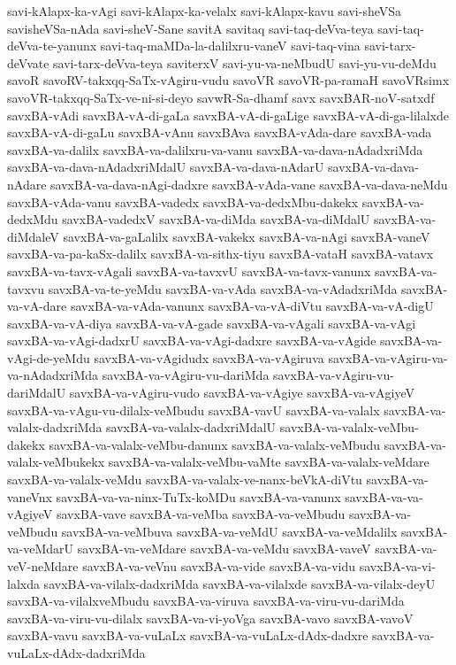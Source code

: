 {savi-kAlapx-ka-vAgi
savi-kAlapx-ka-velalx
savi-kAlapx-kavu
savi-sheVSa
savisheVSa-nAda
savi-sheV-Sane
savitA
savitaq
savi-taq-deVva-teya
savi-taq-deVva-te-yanunx
savi-taq-maMDa-la-dalilxru-vaneV
savi-taq-vina
savi-tarx-deVvate
savi-tarx-deVva-teya
saviterxV
savi-yu-va-neMbudU
savi-yu-vu-deMdu
savoR
savoRV-takxqq-SaTx-vAgiru-vudu
savoVR
savoVR-pa-ramaH
savoVRsimx
savoVR-takxqq-SaTx-ve-ni-si-deyo
savwR-Sa-dhamf
savx
savxBAR-noV-satxdf
savxBA-vAdi
savxBA-vA-di-gaLa
savxBA-vA-di-gaLige
savxBA-vA-di-ga-lilalxde
savxBA-vA-di-gaLu
savxBA-vAnu
savxBAva
savxBA-vAda-dare
savxBA-vada
savxBA-va-dalilx
savxBA-va-dalilxru-va-vanu
savxBA-va-dava-nAdadxriMda
savxBA-va-dava-nAdadxriMdalU
savxBA-va-dava-nAdarU
savxBA-va-dava-nAdare
savxBA-va-dava-nAgi-dadxre
savxBA-vAda-vane
savxBA-va-dava-neMdu
savxBA-vAda-vanu
savxBA-vadedx
savxBA-va-dedxMbu-dakekx
savxBA-va-dedxMdu
savxBA-vadedxV
savxBA-va-diMda
savxBA-va-diMdalU
savxBA-va-diMdaleV
savxBA-va-gaLalilx
savxBA-vakekx
savxBA-va-nAgi
savxBA-vaneV
savxBA-va-pa-kaSx-dalilx
savxBA-va-sithx-tiyu
savxBA-vataH
savxBA-vatavx
savxBA-va-tavx-vAgali
savxBA-va-tavxvU
savxBA-va-tavx-vanunx
savxBA-va-tavxvu
savxBA-va-te-yeMdu
savxBA-va-vAda
savxBA-va-vAdadxriMda
savxBA-va-vA-dare
savxBA-va-vAda-vanunx
savxBA-va-vA-diVtu
savxBA-va-vA-digU
savxBA-va-vA-diya
savxBA-va-vA-gade
savxBA-va-vAgali
savxBA-va-vAgi
savxBA-va-vAgi-dadxrU
savxBA-va-vAgi-dadxre
savxBA-va-vAgide
savxBA-va-vAgi-de-yeMdu
savxBA-va-vAgidudx
savxBA-va-vAgiruva
savxBA-va-vAgiru-va-va-nAdadxriMda
savxBA-va-vAgiru-vu-dariMda
savxBA-va-vAgiru-vu-dariMdalU
savxBA-va-vAgiru-vudo
savxBA-va-vAgiye
savxBA-va-vAgiyeV
savxBA-va-vAgu-vu-dilalx-veMbudu
savxBA-vavU
savxBA-va-valalx
savxBA-va-valalx-dadxriMda
savxBA-va-valalx-dadxriMdalU
savxBA-va-valalx-veMbu-dakekx
savxBA-va-valalx-veMbu-danunx
savxBA-va-valalx-veMbudu
savxBA-va-valalx-veMbukekx
savxBA-va-valalx-veMbu-vaMte
savxBA-va-valalx-veMdare
savxBA-va-valalx-veMdu
savxBA-va-valalx-ve-nanx-beVkA-diVtu
savxBA-va-vaneVnx
savxBA-va-va-ninx-TuTx-koMDu
savxBA-va-vanunx
savxBA-va-va-vAgiyeV
savxBA-vave
savxBA-va-veMba
savxBA-va-veMbudu
savxBA-va-veMbudu
savxBA-va-veMbuva
savxBA-va-veMdU
savxBA-va-veMdalilx
savxBA-va-veMdarU
savxBA-va-veMdare
savxBA-va-veMdu
savxBA-vaveV
savxBA-va-veV-neMdare
savxBA-va-veVnu
savxBA-va-vide
savxBA-va-vidu
savxBA-va-vi-lalxda
savxBA-va-vilalx-dadxriMda
savxBA-va-vilalxde
savxBA-va-vilalx-deyU
savxBA-va-vilalxveMbudu
savxBA-va-viruva
savxBA-va-viru-vu-dariMda
savxBA-va-viru-vu-dilalx
savxBA-va-vi-yoVga
savxBA-vavo
savxBA-vavoV
savxBA-vavu
savxBA-va-vuLaLx
savxBA-va-vuLaLx-dAdx-dadxre
savxBA-va-vuLaLx-dAdx-dadxriMda
}
